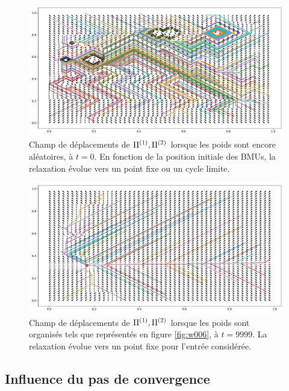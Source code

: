 \begin{figure}
\centering
\includegraphics[width=\textwidth]{champ_006_t1.pdf}
\caption{Champ de déplacements de $\Pi^{({1})},\Pi^{({2})}$ lorsque les poids sont encore aléatoires, à $t=0$. En fonction de la position initiale des BMUs, la relaxation évolue vers un point fixe ou un cycle limite.}
\label{fig:champ_0}
\end{figure}


\begin{figure}
\centering
\includegraphics[width=\textwidth]{champ_006.pdf}
\caption{Champ de déplacements de $\Pi^{({1})},\Pi^{({2})}$ lorsque les poids sont organisés tels que représentés en figure \ref{fig:w006}, à $t=9999$. La relaxation évolue vers un point fixe pour l'entrée considérée.}
\label{fig:champ_9999}
\end{figure}

\subsection{Influence du pas de convergence}

